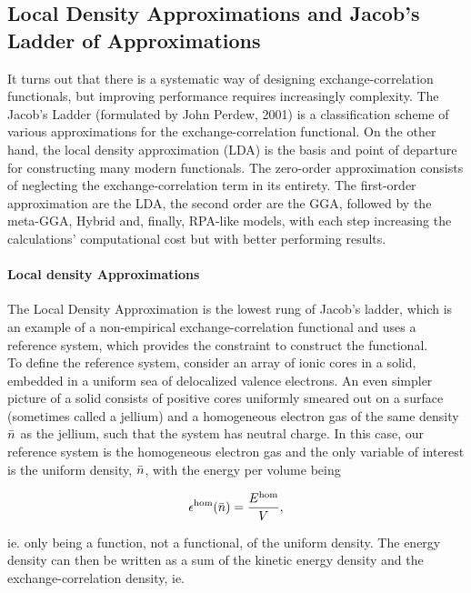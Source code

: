 \documentclass{homework}
\begin{document}
\subsection{Local Density Approximations and Jacob's Ladder of Approximations}

It turns out that there is a systematic way of designing exchange-correlation functionals, but improving performance requires increasingly complexity. The Jacob's Ladder (formulated by John Perdew, 2001) is a classification scheme of various approximations for the exchange-correlation functional. On the other hand, the local density approximation (LDA) is the basis and point of departure for constructing many modern functionals. The zero-order approximation consists of neglecting the exchange-correlation term in its entirety. The first-order approximation are the LDA, the second order are the GGA, followed by the meta-GGA, Hybrid and, finally, RPA-like models, with each step increasing the calculations' computational cost but with better performing results. \\

\paragraph{\textbf{Local density Approximations}}

The Local Density Approximation is the lowest rung of Jacob's ladder, which is an example of a non-empirical exchange-correlation functional and uses a reference system, which provides the constraint to construct the functional. \\

To define the reference system, consider an array of ionic cores in a solid, embedded in a uniform sea of delocalized valence electrons. An even simpler picture of a solid consists of positive cores uniformly smeared out on a surface (sometimes called a jellium) and a homogeneous electron gas of the same density $\Bar{n}$ as the jellium, such that the system has neutral charge. In this case, our reference system is the homogeneous electron gas and the only variable of interest is the uniform density, $\Bar{n}$, with the energy per volume being

$$
\epsilon^{\textnormal{hom}}(\Bar{n}) = \frac{E^{\textnormal{hom}}}{V},
$$

ie. only being a function, not a functional, of the uniform density. The energy density can then be written as a sum of the kinetic energy density and the exchange-correlation density, ie. 
\end{document}
